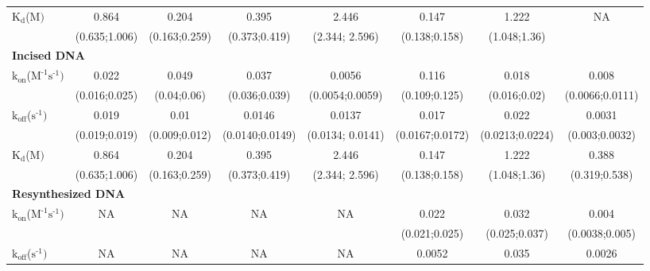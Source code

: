 \begin{table}[H]
\begin{tabular}{lccccccc}
		$\text{K}_{\text{d}}$({\textmu}$\text{M})$                                                  & 0.864                     & 0.204                   & 0.395                 &2.446                 &0.147                    &1.222                    &NA     \\
		& (0.635;1.006)     & (0.163;0.259)             & (0.373;0.419)		&(2.344; 2.596)&(0.138;0.158)     &  (1.048;1.36)  &   \\
		\multicolumn{8}{l}{\textbf{Incised DNA}} \\
		$\text{k}_{\text{on}}$({\textmu}$\text{M}^{\text{-1}}\text{s}^{\text{-1}})$    & 0.022                     & 0.049                   & 0.037                 &  0.0056             & 0.116                   &0.018                    & 0.008    \\
		& (0.016;0.025)     & (0.04;0.06)   					&(0.036;0.039) 		 & (0.0054;0.0059)&(0.109;0.125)    &(0.016;0.02)    	& (0.0066;0.0111)    \\
		$\text{k}_{\text{off}}$($\text{s}^{\text{-1}})$                                              & 0.019                     & 0.01                   & 0.0146               & 0.0137                & 0.017                   & 0.022                 &0.0031     \\
		& (0.019;0.019)     & (0.009;0.012)             & (0.0140;0.0149)&(0.0134; 0.0141)&(0.0167;0.0172)     &  (0.0213;0.0224)    & (0.003;0.0032)  \\
		$\text{K}_{\text{d}}$({\textmu}$\text{M})$                                                   & 0.864                     & 0.204                   & 0.395                 &2.446                 &0.147                    &1.222                   &0.388    \\
		& (0.635;1.006)     & (0.163;0.259)             & (0.373;0.419)		&(2.344; 2.596)&(0.138;0.158)     &  (1.048;1.36)  					& (0.319;0.538)   \\
		\multicolumn{8}{l}{\textbf{Resynthesized DNA}} \\
		$\text{k}_{\text{on}}$({\textmu}$\text{M}^{\text{-1}}\text{s}^{\text{-1}})$    & NA                          & NA                        & NA                      &  NA                    & 0.022                   &0.032                    &0.004    \\
		&                               &                             &                            &                          &(0.021;0.025)    &(0.025;0.037)    & (0.0038;0.005)    \\
		$\text{k}_{\text{off}}$($\text{s}^{\text{-1}})$                                             & NA                          &NA                          & NA                      & NA                     & 0.0052                  & 0.035                   &0.0026     \\

\end{tabular}
\end{table}
